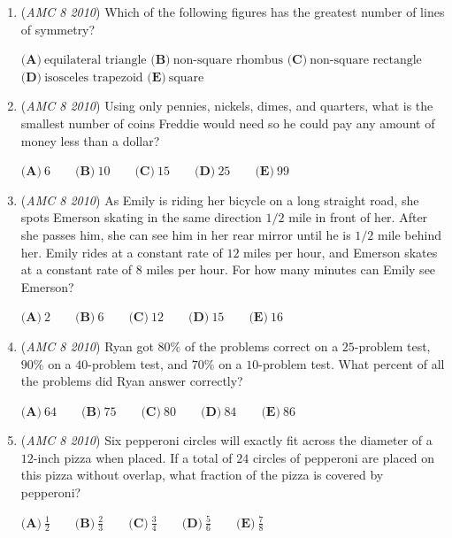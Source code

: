 \begin{enumerate}
 $\textbf{(A)}\ 32 \qquad\textbf{(B)}\ 34\qquad\textbf{(C)}\ 36\qquad\textbf{(D)}\ 38\qquad\textbf{(E)}\ 40$


	\item (\textit{AMC 8 2010}) Which of the following figures has the greatest number of lines of symmetry? 


 $\textbf{(A)}\ \text{equilateral triangle}$
$\textbf{(B)}\ \text{non-square rhombus}$
$\textbf{(C)}\ \text{non-square rectangle}$
$\textbf{(D)}\ \text{isosceles trapezoid}$
$\textbf{(E)}\ \text{square}$


	\item (\textit{AMC 8 2010}) Using only pennies, nickels, dimes, and quarters, what is the smallest number of coins Freddie would need so he could pay any amount of money less than a dollar? 


 $\textbf{(A)}\ 6 \qquad\textbf{(B)}\ 10\qquad\textbf{(C)}\ 15\qquad\textbf{(D)}\ 25\qquad\textbf{(E)}\ 99$


	\item (\textit{AMC 8 2010}) As Emily is riding her bicycle on a long straight road, she spots Emerson skating in the same direction $1/2$ mile in front of her. After she passes him, she can see him in her rear mirror until he is $1/2$ mile behind her. Emily rides at a constant rate of $12$ miles per hour, and Emerson skates at a constant rate of $8$ miles per hour. For how many minutes can Emily see Emerson?


 $\textbf{(A)}\ 2 \qquad\textbf{(B)}\ 6\qquad\textbf{(C)}\ 12\qquad\textbf{(D)}\ 15\qquad\textbf{(E)}\ 16$


	\item (\textit{AMC 8 2010}) Ryan got $80\%$ of the problems correct on a $25$-problem test, $90\%$ on a $40$-problem test, and $70\%$ on a $10$-problem test. What percent of all the problems did Ryan answer correctly? 


 $\textbf{(A)}\ 64 \qquad\textbf{(B)}\ 75\qquad\textbf{(C)}\ 80\qquad\textbf{(D)}\ 84\qquad\textbf{(E)}\ 86$


	\item (\textit{AMC 8 2010}) Six pepperoni circles will exactly fit across the diameter of a $12$-inch pizza when placed. If a total of $24$ circles of pepperoni are placed on this pizza without overlap, what fraction of the pizza is covered by pepperoni?


 $\textbf{(A)}\ \frac 12 \qquad\textbf{(B)}\ \frac 23 \qquad\textbf{(C)}\ \frac 34 \qquad\textbf{(D)}\ \frac 56 \qquad\textbf{(E)}\ \frac 78$



\end{enumerate}

